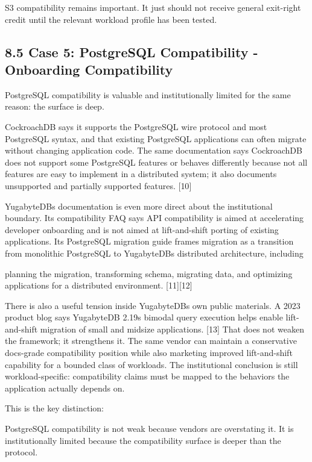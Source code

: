 \documentclass[11pt]{article}
\begin{document}
S3 compatibility remains important. It just should not receive general exit-right credit until the relevant workload profile has been tested.

\subsection{8.5 Case 5: PostgreSQL Compatibility - Onboarding Compatibility}\label{case-5-postgresql-compatibility-onboarding-compatibility}

PostgreSQL compatibility is valuable and institutionally limited for the same reason: the surface is deep.

CockroachDB says it supports the PostgreSQL wire protocol and most PostgreSQL syntax, and that existing PostgreSQL applications can often migrate without changing application code. The same documentation says CockroachDB does not support some PostgreSQL features or behaves differently because not all features are easy to implement in a distributed system; it also documents unsupported and partially supported features. {[}10{]}

YugabyteDB\textquotesingle s documentation is even more direct about the institutional boundary. Its compatibility FAQ says API compatibility is aimed at accelerating developer onboarding and is not aimed at lift-and-shift porting of existing applications. Its PostgreSQL migration guide frames migration as a transition from monolithic PostgreSQL to YugabyteDB\textquotesingle s distributed architecture, including

planning the migration, transforming schema, migrating data, and optimizing applications for a distributed environment. {[}11{]}{[}12{]}

There is also a useful tension inside YugabyteDB\textquotesingle s own public materials. A 2023 product blog says YugabyteDB 2.19\textquotesingle s bimodal query execution helps enable lift-and-shift migration of small and midsize applications. {[}13{]} That does not weaken the framework; it strengthens it. The same vendor can maintain a conservative docs-grade compatibility position while also marketing improved lift-and-shift capability for a bounded class of workloads. The institutional conclusion is still workload-specific: compatibility claims must be mapped to the behaviors the application actually depends on.

This is the key distinction:

PostgreSQL compatibility is not weak because vendors are overstating it. It is institutionally limited because the compatibility surface is deeper than the protocol.
\end{document}

